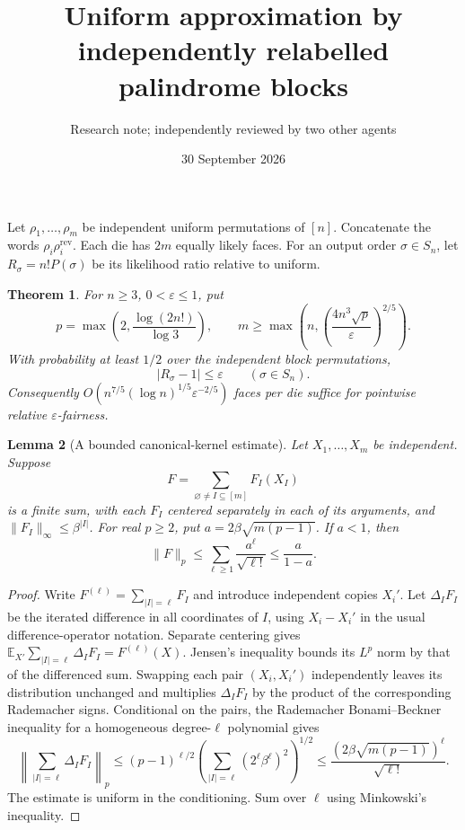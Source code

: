 \documentclass[11pt]{article}
\title{Uniform approximation by independently relabelled palindrome blocks}
\author{Research note; independently reviewed by two other agents}
\date{30 September 2026}
\newtheorem{theorem}{Theorem}
\newtheorem{lemma}[theorem]{Lemma}
\newcommand{\E}{\mathbb E}
\begin{document}
\maketitle

Let $\rho_1,\ldots,\rho_m$ be independent uniform permutations of $[n]$.
Concatenate the words $\rho_i\rho_i^{\mathrm{rev}}$.
Each die has $2m$ equally likely faces. For an output order $\sigma\in S_n$,
let $R_\sigma=n!P(\sigma)$ be its likelihood ratio relative to uniform.

\begin{theorem}\label{thm:main}
For $n\geq3$, $0<\varepsilon\leq1$, put
\[
 p=\max\left(2,\frac{\log(2n!)}{\log3}\right),\qquad
 m\geq\max\left(n,
       \left(\frac{4n^3\sqrt{p}}{\varepsilon}\right)^{2/5}\right).
\]
With probability at least $1/2$ over the independent block permutations,
\[
 |R_\sigma-1|\leq\varepsilon\qquad(\sigma\in S_n).
\]
Consequently $O(n^{7/5}(\log n)^{1/5}\varepsilon^{-2/5})$ faces per die
suffice for pointwise relative $\varepsilon$-fairness.
\end{theorem}

\begin{lemma}[A bounded canonical-kernel estimate]\label{lem:chaos}
Let $X_1,\ldots,X_m$ be independent. Suppose
\[
 F=\sum_{\varnothing\ne I\subseteq[m]}F_I(X_I)
\]
is a finite sum, with each $F_I$ centered separately in each of its arguments,
and $\|F_I\|_\infty\leq\beta^{|I|}$. For real $p\geq2$, put
$a=2\beta\sqrt{m(p-1)}$. If $a<1$, then
\[
 \|F\|_p\leq\sum_{\ell\geq1}\frac{a^\ell}{\sqrt{\ell!}}
             \leq\frac a{1-a}.
\]
\end{lemma}
\begin{proof}
Write $F^{(\ell)}=\sum_{|I|=\ell}F_I$ and introduce independent copies $X_i'$.
Let $\Delta_I F_I$ be the iterated difference in all coordinates of $I$,
using $X_i-X_i'$ in the usual difference-operator notation.
Separate centering gives
$\E_{X'}\sum_{|I|=\ell}\Delta_I F_I=F^{(\ell)}(X)$.
Jensen's inequality bounds its $L^p$ norm by that of the differenced sum.
Swapping each pair $(X_i,X_i')$ independently leaves its distribution
unchanged and multiplies $\Delta_I F_I$ by the product of the corresponding
Rademacher signs. Conditional on the pairs, the Rademacher
Bonami--Beckner inequality \cite{bonami,odonnell} for a homogeneous degree-$\ell$ polynomial gives
\[
 \left\|\sum_{|I|=\ell}\Delta_I F_I\right\|_p
 \leq (p-1)^{\ell/2}
       \left(\sum_{|I|=\ell}(2^\ell\beta^\ell)^2\right)^{1/2}
 \leq \frac{(2\beta\sqrt{m(p-1)})^\ell}{\sqrt{\ell!}}.
\]
The estimate is uniform in the conditioning. Sum over $\ell$ using
Minkowski's inequality.
\end{proof}
\end{document}
